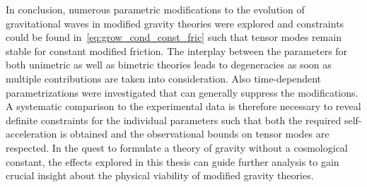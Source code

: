 In conclusion, numerous parametric modifications to the evolution of gravitational waves in modified gravity theories were explored and constraints could be found in~\eqref{eq:grow_cond_const_fric} such that tensor modes remain stable for constant modified friction. The interplay between the parameters for both unimetric as well as bimetric theories leads to degeneracies as soon as multiple contributions are taken into consideration. Also time-dependent parametrizations were investigated that can generally suppress the modifications. A systematic comparison to the experimental data is therefore necessary to reveal definite constraints for the individual parameters such that both the required self-acceleration is obtained and the observational bounds on tensor modes are respected. In the quest to formulate a theory of gravity without a cosmological constant, the effects explored in this thesis can guide further analysis to gain crucial insight about the physical viability of modified gravity theories.
